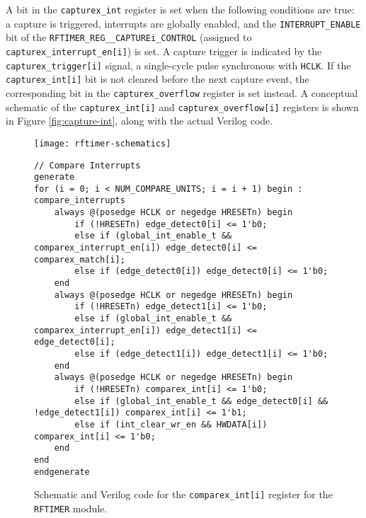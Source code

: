 A bit in the \texttt{capturex\_int} register is set when the following conditions are true: a capture is triggered, interrupts are globally enabled, and the \texttt{INTERRUPT\_ENABLE} bit of the \texttt{RFTIMER\_REG\_\_CAPTUREi\_CONTROL} (assigned to \texttt{capturex\_interrupt\_en[i]}) is set. A capture trigger is indicated by the \texttt{capturex\_trigger[i]} signal, a single-cycle pulse synchronous with \texttt{HCLK}. If the \texttt{capturex\_int[i]} bit is not cleared before the next capture event, the corresponding bit in the \texttt{capturex\_overflow} register is set instead.  A conceptual schematic of the \texttt{capturex\_int[i]} and \texttt{capturex\_over\-flow[i]} registers is shown in Figure \ref{fig:capture-int}, along with the actual Verilog code.

\begin{figure}
	\centering
	\texttt{[image: rftimer-schematics]}
	\begin{lstlisting}
// Compare Interrupts
generate
for (i = 0; i < NUM_COMPARE_UNITS; i = i + 1) begin : compare_interrupts
    always @(posedge HCLK or negedge HRESETn) begin
        if (!HRESETn) edge_detect0[i] <= 1'b0;
        else if (global_int_enable_t && comparex_interrupt_en[i]) edge_detect0[i] <= comparex_match[i];
        else if (edge_detect0[i]) edge_detect0[i] <= 1'b0;
    end
    always @(posedge HCLK or negedge HRESETn) begin
        if (!HRESETn) edge_detect1[i] <= 1'b0;
        else if (global_int_enable_t && comparex_interrupt_en[i]) edge_detect1[i] <= edge_detect0[i];
        else if (edge_detect1[i]) edge_detect1[i] <= 1'b0;
    end
    always @(posedge HCLK or negedge HRESETn) begin
        if (!HRESETn) comparex_int[i] <= 1'b0;
        else if (global_int_enable_t && edge_detect0[i] && !edge_detect1[i]) comparex_int[i] <= 1'b1;
        else if (int_clear_wr_en && HWDATA[i]) comparex_int[i] <= 1'b0;
    end
end
endgenerate
	\end{lstlisting}
	\caption{Schematic and Verilog code for the \texttt{comparex\_int[i]} register for the \texttt{RFTIMER} module.}
	\label{fig:compare-int}
\end{figure}
